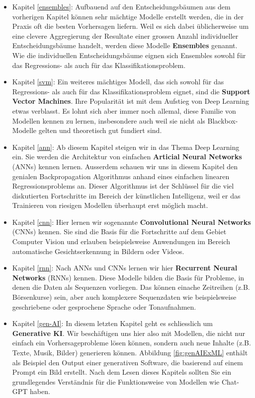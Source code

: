 \documentclass[
]{book}
\begin{document}
\begin{itemize}
\item
  Kapitel \ref{ensembles}: Aufbauend auf den Entscheidungsbäumen aus dem vorherigen Kapitel können sehr mächtige Modelle erstellt werden, die in der Praxis oft die besten Vorhersagen liefern. Weil es sich dabei üblicherweise um eine clevere Aggregierung der Resultate einer grossen Anzahl individueller Entscheidungsbäume handelt, werden diese Modelle \textbf{Ensembles} genannt. Wie die individuellen Entscheidungsbäume eignen sich Ensembles sowohl für das Regressions- als auch für das Klassifikationsproblem.
\item
  Kapitel \ref{svm}: Ein weiteres mächtiges Modell, das sich sowohl für das Regressions- als auch für das Klassifikationsproblem eignet, sind die \textbf{Support Vector Machines}. Ihre Popularität ist mit dem Aufstieg von Deep Learning etwas verblasst. Es lohnt sich aber immer noch allemal, diese Familie von Modellen kennen zu lernen, insbesondere auch weil sie nicht als Blackbox-Modelle gelten und theoretisch gut fundiert sind.
\item
  Kapitel \ref{ann}: Ab diesem Kapitel steigen wir in das Thema Deep Learning ein. Sie werden die Architektur von einfachen \textbf{Articial Neural Networks} (ANNs) kennen lernen. Ausserdem schauen wir uns in diesem Kapitel den genialen Backpropagation Algorithmus anhand eines einfachen linearen Regressionsproblems an. Dieser Algorithmus ist der Schlüssel für die viel diskutierten Fortschritte im Bereich der künstlichen Intelligenz, weil er das Trainieren von riesigen Modellen überhaupt erst möglich macht.
\item
  Kapitel \ref{cnn}: Hier lernen wir sogenannte \textbf{Convolutional Neural Networks} (CNNs) kennen. Sie sind die Basis für die Fortschritte auf dem Gebiet Computer Vision und erlauben beispielsweise Anwendungen im Bereich automatische Gesichtserkennung in Bildern oder Videos.
\item
  Kapitel \ref{rnn}: Nach ANNs und CNNs lernen wir hier \textbf{Recurrent Neural Networks} (RNNs) kennen. Diese Modelle bilden die Basis für Probleme, in denen die Daten als Sequenzen vorliegen. Das können einache Zeitreihen (z.B. Börsenkurse) sein, aber auch komplexere Sequenzdaten wie beispielsweise geschriebene oder gesprochene Sprache oder Tonaufnahmen.
\item
  Kapitel \ref{gen-AI}: In diesem letzten Kapitel geht es schliesslich um \textbf{Generative KI}. Wir beschäftigen uns hier also mit Modellen, die nicht nur einfach ein Vorhersageprobleme lösen können, sondern auch neue Inhalte (z.B. Texte, Musik, Bilder) generieren können. Abbildung \ref{fig:genAIExML} enthält als Beispiel den Output einer generativen Software, die basierend auf einem Prompt ein Bild erstellt. Nach dem Lesen dieses Kapitels sollten Sie ein grundlegendes Verständnis für die Funktionsweise von Modellen wie Chat-GPT haben.
\end{itemize}
\end{document}
